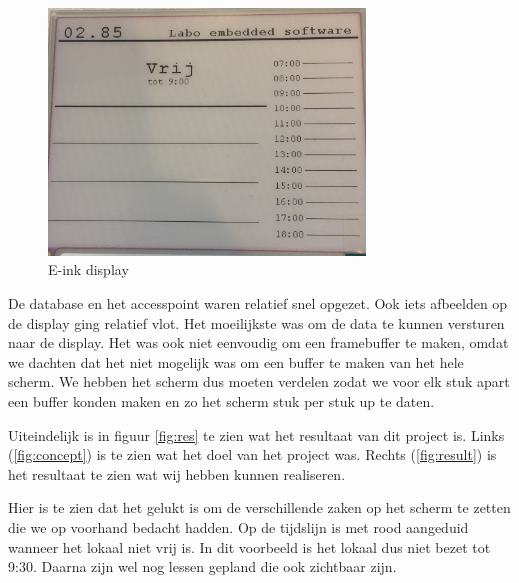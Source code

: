 \documentclass[a4paper,kul]{kulakarticle} %
\begin{document}
\begin{figure}[h]
	\centering
	\includegraphics[width=0.75\textwidth]{vbScherm}
	\caption{E-ink display}
	\label{fig:vbscherm}
\end{figure}

De database en het accesspoint waren relatief snel opgezet. Ook iets afbeelden op de display ging relatief vlot. Het moeilijkste was om de data te kunnen versturen naar de display. Het was ook niet eenvoudig om een framebuffer te maken, omdat we dachten dat het niet mogelijk was om een buffer te maken van het hele scherm. We hebben het scherm dus moeten verdelen zodat we voor elk stuk apart een buffer konden maken en zo het scherm stuk per stuk up te daten.
\newline
\newline

Uiteindelijk is in figuur \ref{fig:res} te zien wat het resultaat van dit project is. Links (\ref{fig:concept}) is te zien wat het doel van het project was. Rechts (\ref{fig:result}) is het resultaat te zien wat wij hebben kunnen realiseren.

Hier is te zien dat het gelukt is om de verschillende zaken op het scherm te zetten die we op voorhand bedacht hadden. Op de tijdslijn is met rood aangeduid wanneer het lokaal niet vrij is. In dit voorbeeld is het lokaal dus niet bezet tot 9:30. Daarna zijn wel nog lessen gepland die ook zichtbaar zijn. 
\end{document}
